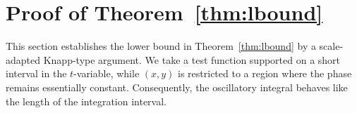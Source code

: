 \documentclass[10pt]{amsart}
\numberwithin{equation}{section}
\theoremstyle{definition}
\theoremstyle{remark}
\theoremstyle{remark}
\begin{document}
	
	
	
	
	
	
	\section{Proof of Theorem~\ref{thm:lbound}}\label{sec:lower}
	This section establishes the lower bound in Theorem~\ref{thm:lbound} by a scale-adapted Knapp-type argument.
    We take a test function supported on a short interval in the $t$-variable,
    while $(x,y)$ is restricted to a region where the phase remains essentially
    constant.
    Consequently, the oscillatory integral behaves like the length of the
    integration interval.
	
\end{document}
